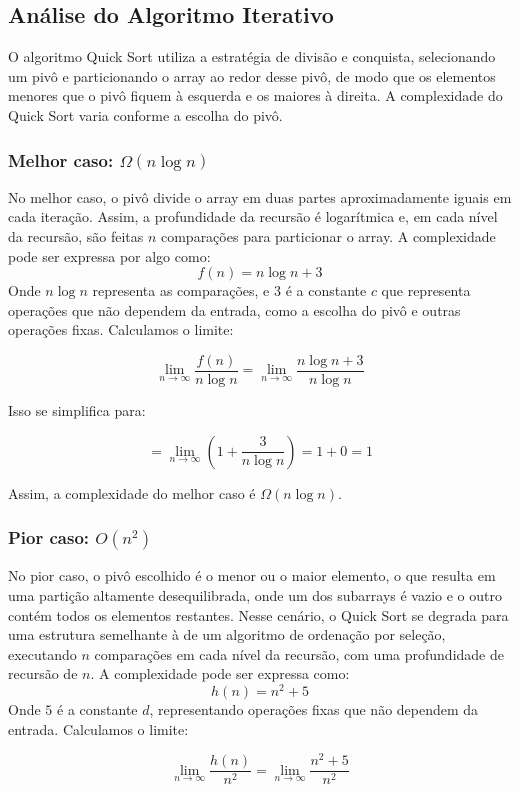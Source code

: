 \subsection{Análise do Algoritmo Iterativo}

O algoritmo Quick Sort utiliza a estratégia de divisão e conquista, selecionando um pivô e particionando o array ao redor desse pivô, de modo que os elementos menores que o pivô fiquem à esquerda e os maiores à direita. A complexidade do Quick Sort varia conforme a escolha do pivô.

\subsubsection{Melhor caso: \(\Omega(n \log n)\)}
No melhor caso, o pivô divide o array em duas partes aproximadamente iguais em cada iteração. Assim, a profundidade da recursão é logarítmica e, em cada nível da recursão, são feitas \(n\) comparações para particionar o array. A complexidade pode ser expressa por algo como:
\[
f(n) = n \log n + 3
\]
Onde \(n \log n\) representa as comparações, e \(3\) é a constante \(c\) que representa operações que não dependem da entrada, como a escolha do pivô e outras operações fixas. Calculamos o limite:

\[
\lim_{n \to \infty} \frac{f(n)}{n \log n} = \lim_{n \to \infty} \frac{n \log n + 3}{n \log n}
\]

Isso se simplifica para:

\[
= \lim_{n \to \infty} \left(1 + \frac{3}{n \log n}\right) = 1 + 0 = 1
\]

Assim, a complexidade do melhor caso é \(\Omega(n \log n)\).

\subsubsection{Pior caso: \(O(n^2)\)}
No pior caso, o pivô escolhido é o menor ou o maior elemento, o que resulta em uma partição altamente desequilibrada, onde um dos subarrays é vazio e o outro contém todos os elementos restantes. Nesse cenário, o Quick Sort se degrada para uma estrutura semelhante à de um algoritmo de ordenação por seleção, executando \(n\) comparações em cada nível da recursão, com uma profundidade de recursão de \(n\). A complexidade pode ser expressa como:
\[
h(n) = n^2 + 5
\]
Onde \(5\) é a constante \(d\), representando operações fixas que não dependem da entrada. Calculamos o limite:

\[
\lim_{n \to \infty} \frac{h(n)}{n^2} = \lim_{n \to \infty} \frac{n^2 + 5}{n^2}
\]

